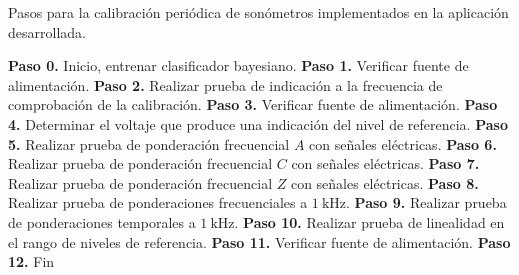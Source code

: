 \begin{algorithm}[H]
    \caption{Pasos para la calibración periódica de sonómetros implementados en la aplicación desarrollada.}
    \label{alg:slm_calibration_steps}
    \scriptsize
    \DontPrintSemicolon
    \textbf{Paso 0.} Inicio, entrenar clasificador bayesiano. \;
    \textbf{Paso 1.} Verificar fuente de alimentación.\;
    \textbf{Paso 2.} Realizar prueba de indicación a la frecuencia de comprobación de la calibración.\;
    \textbf{Paso 3.} Verificar fuente de alimentación.\;
    \textbf{Paso 4.} Determinar el voltaje que produce una indicación del nivel de referencia.\;
    \textbf{Paso 5.} Realizar prueba de ponderación frecuencial $A$ con señales eléctricas.\;
    \textbf{Paso 6.} Realizar prueba de ponderación frecuencial $C$ con señales eléctricas.\;
    \textbf{Paso 7.} Realizar prueba de ponderación frecuencial $Z$ con señales eléctricas.\;
    \textbf{Paso 8.} Realizar prueba de ponderaciones frecuenciales a $\qty{1}{\kHz}$.\;
    \textbf{Paso 9.} Realizar prueba de ponderaciones temporales a $\qty{1}{\kHz}$.\;
    \textbf{Paso 10.} Realizar prueba de linealidad en el rango de niveles de referencia.\;
    \textbf{Paso 11.} Verificar fuente de alimentación.\;
    \textbf{Paso 12.} Fin\;
\end{algorithm}


